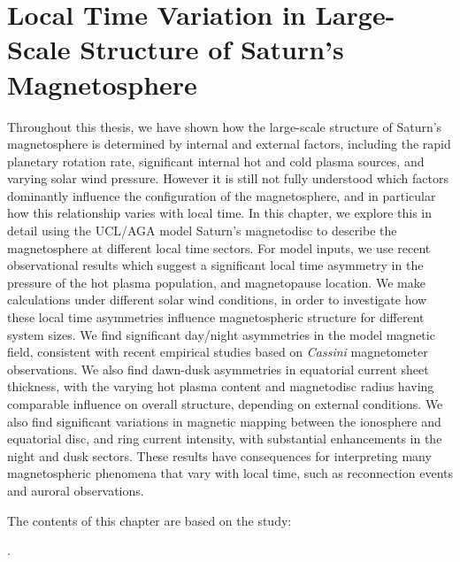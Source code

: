 \chapter{Local Time Variation in Large-Scale Structure of Saturn's Magnetosphere}
\label{chap:LTsectors}
Throughout this thesis, we have shown how the large-scale structure of Saturn's magnetosphere is determined by internal and external factors, including the rapid planetary rotation rate, significant internal hot and cold plasma sources, and varying solar wind pressure. However it is still not fully understood which factors dominantly influence the configuration of the magnetosphere, and in particular how this relationship varies with local time. In this chapter, we explore this in detail using the UCL/AGA model Saturn's magnetodisc to describe the magnetosphere at different local time sectors. For model inputs, we use recent observational results which suggest a significant local time asymmetry in the pressure of the hot plasma population, and magnetopause location. We make calculations under different solar wind conditions, in order to investigate how these local time asymmetries influence magnetospheric structure for different system sizes. We find significant day/night asymmetries in the model magnetic field, consistent with recent empirical studies based on \textit{Cassini} magnetometer observations. We also find dawn-dusk asymmetries in equatorial current sheet thickness, with the varying hot plasma content and magnetodisc radius having comparable influence on overall structure, depending on external conditions. We also find significant variations in magnetic mapping between the ionosphere and equatorial disc, and ring current intensity, with substantial enhancements in the night and dusk sectors. These results have consequences for interpreting many magnetospheric phenomena that vary with local time, such as reconnection events and auroral observations. 

The contents of this chapter are based on the study: 

. 

